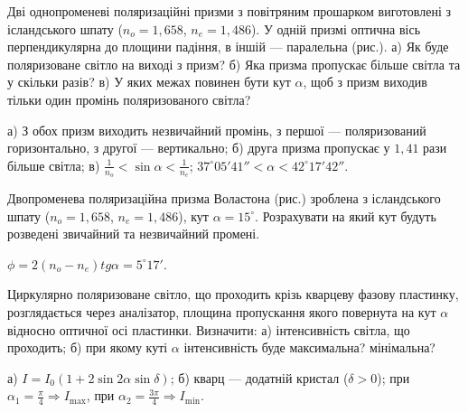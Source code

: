 \begin{problem}%
    Дві однопроменеві поляризаційні призми з повітряним прошарком виготовлені з ісландського шпату ($ n_o =1,658 $, $ n_e = 1,486 $). У одній призмі оптична вісь перпендикулярна до площини падіння, в іншій --- паралельна (рис.). а) Як буде поляризоване світло на виході з призм? б) Яка призма пропускає більше світла та у скільки разів? в) У яких межах повинен бути кут $ \alpha $, щоб з призм виходив тільки один промінь поляризованого світла?

    \begin{center}
        
    \end{center}

    \begin{solution}
        а) З обох призм виходить незвичайний промінь, з першої --- поляризований горизонтально, з другої --- вертикально; б) друга призма пропускає у $ 1,41 $ рази більше світла; в) $ \frac{1}{n_o} < \sin \alpha<\frac{1}{n_e} $; $ 37^\circ05'41''<\alpha<42^\circ17'42'' $.
    \end{solution}
\end{problem}


\begin{problem}%
    Двопроменева поляризаційна призма Воластона (рис.) зроблена з ісландського шпату ($ n_o =1,658 $, $ n_e= 1,486 $), кут $ \alpha = 15^\circ $. Розрахувати на який кут будуть розведені звичайний та незвичайний промені.

        \begin{center}
            
        \end{center}

    \begin{solution}
        $ \phi = 2(n_o - n_e)tg\alpha = 5^\circ17' $.
    \end{solution}
\end{problem}


\begin{problem}%
    Циркулярно поляризоване світло, що проходить крізь кварцеву фазову пластинку, розглядається через аналізатор, площина пропускання якого повернута на кут $ \alpha $ відносно оптичної осі пластинки. Визначити: а) інтенсивність світла, що проходить; б) при якому куті $ \alpha $ інтенсивність буде максимальна? мінімальна?
    \begin{solution}
        а) $ I = I_0(1 + 2\sin2\alpha\sin\delta)$; б) кварц --- додатній кристал ($ \delta > 0 $); при $ \alpha_1 = \frac{\pi}{4} \Rightarrow I_{\max} $, при $ \alpha_2 = \frac{3\pi}{4} \Rightarrow I_{\min}$.
    \end{solution}
\end{problem}


